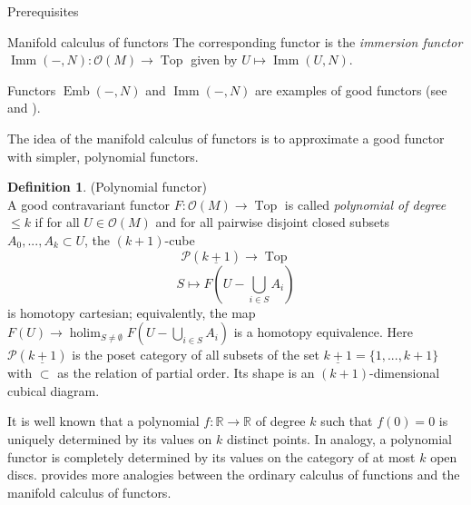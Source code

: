 \documentclass[12pt]{amsart}
\newcommand{\R}{{\mathbb R}}
\newcommand{\holim}{\operatorname{holim}}
\newcommand{\Emb}{\operatorname{Emb}}
\newcommand{\Imm}{\operatorname{Imm}}
\newcommand{\Top}{\operatorname{Top}}
\theoremstyle{plain}
\theoremstyle{definition}
\newtheorem{defin}[thm]{Definition}
\theoremstyle{remark}
\begin{document}
\begin{section}{Prerequisites}
\begin{subsection}{Manifold calculus of functors}
The corresponding functor is the \textit{immersion functor} $\Imm(-,N): \mathcal{O}(M) \to \Top$ given by $U \mapsto \Imm(U,N)$.

Functors $\Emb(-,N)$ and $\Imm(-,N)$ are examples of good functors (see \cite{W:EI1} and \cite{GKW:EmbDisjSurg}).

The idea of the manifold calculus of functors is to approximate a good functor with simpler, polynomial functors.
\begin{defin}(Polynomial functor)\\
A good contravariant functor $F: \mathcal{O}(M) \to \Top$ is called \textit{polynomial of degree $\leq k$} if for all $U \in \mathcal{O}(M)$ and for all pairwise disjoint closed subsets $A_0, ..., A_k \subset U$, the $(k+1)$-cube $$\mathcal{P}(\underline{k+1}) \to \Top$$ $$S \mapsto F(U - \bigcup_{i\in S}A_i)$$ is homotopy cartesian; equivalently, the map $F(U) \to \holim_{S \neq \emptyset} F(U - \bigcup_{i\in S}A_i)$ is a homotopy equivalence. Here $\mathcal{P}(\underline{k+1})$ is the poset category of all subsets of the set $\underline{k+1}=\{1,...,k+1\}$ with $\subset$ as the relation of partial order. Its shape is an $(k+1)$-dimensional cubical diagram.
\end{defin}

It is well known that a polynomial $f: \R \rightarrow \R$ of degree $k$ such that $f(0)=0$ is uniquely determined by its values on $k$ distinct points. In analogy, a polynomial functor is completely determined by its values on the category of at most $k$ open discs. \cite{M:MfldCalc} provides more analogies between the ordinary calculus of functions and the manifold calculus of functors.


\end{subsection}
\end{section}
\end{document}
